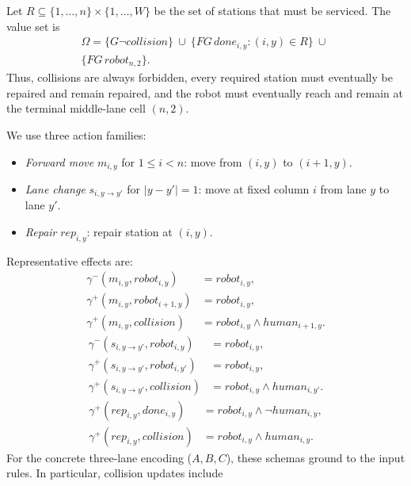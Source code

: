 \documentclass[a4paper,fleqn]{cas-dc}
\begin{document}
Let $R\subseteq \{1,\dots,n\}\times\{1,\dots,W\}$ be the set of stations that must be serviced.
The value set is
\begin{equation}
\begin{aligned}
\Omega=\{G\neg collision\}\ \cup\ \{FG\,done_{i,y}:(i,y)\in R\}\ \cup\ \\ \{FG\,robot_{n,2}\}.
\end{aligned}
\end{equation}
Thus, collisions are always forbidden, every required station must eventually be repaired and remain repaired, and the robot must eventually reach and remain at the terminal middle-lane cell $(n,2)$.

We use three action families:
\begin{itemize}
    \item {\it Forward move} $m_{i,y}$ for $1\le i<n$: move from $(i,y)$ to $(i+1,y)$.
    \item {\it Lane change} $s_{i,y\to y'}$ for $|y-y'|=1$: move at fixed column $i$ from lane $y$ to lane $y'$.
    \item {\it Repair} $rep_{i,y}$: repair station at $(i,y)$.
\end{itemize}
Representative effects are:
\begin{equation}
\begin{aligned}
\gamma^-(m_{i,y},robot_{i,y})&=robot_{i,y},\\
\gamma^+(m_{i,y},robot_{i+1,y})&=robot_{i,y},\\
\gamma^+(m_{i,y},collision)&=robot_{i,y}\land human_{i+1,y}.
\end{aligned}
\end{equation}
\begin{equation}
\begin{aligned}
\gamma^-(s_{i,y\to y'},robot_{i,y})&=robot_{i,y},\\
\gamma^+(s_{i,y\to y'},robot_{i,y'})&=robot_{i,y},\\
\gamma^+(s_{i,y\to y'},collision)&=robot_{i,y}\land human_{i,y'}.
\end{aligned}
\end{equation}
\begin{equation}
\begin{aligned}
\gamma^+(rep_{i,y},done_{i,y})&=robot_{i,y}\land \neg human_{i,y},\\
\gamma^+(rep_{i,y},collision)&=robot_{i,y}\land human_{i,y}.
\end{aligned}
\end{equation}
For the concrete three-lane encoding ($A,B,C$), these schemas ground to the input rules. In particular, collision updates include
\end{document}
